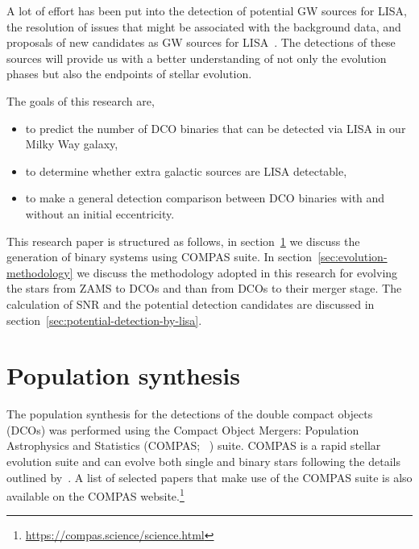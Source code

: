 \documentclass[journal, twocolumn]{IEEEtran}
\begin{document}
    A lot of effort has been put into the detection of potential GW sources for LISA, the resolution of issues that might be associated with the background data, and proposals of new candidates as GW sources for LISA~\cite[see, for example,][]{Lau2020, Sesana2009, Khakhaleva2020, Renzo2021, Fumagalli2022, wagg2021gravitational, Broekgaarden2021, Shao2021, Andrews2020, Belczynski2010, Guo2017, Babak2010, Blaut2010, Babak2008, Ruiter2010, Nelemans2001, Yu2010}.
    The detections of these sources will provide us with a better understanding of not only the evolution phases but also the endpoints of stellar evolution.

    The goals of this research are,
    \begin{itemize}%
        \item to predict the number of DCO binaries that can be detected via LISA in our Milky Way galaxy,
        \item to determine whether extra galactic sources are LISA detectable,
        \item to make a general detection comparison between DCO binaries with and without an initial eccentricity.
    \end{itemize}%

	This research paper is structured as follows, in section~\ref{sec:population_synthesis} we discuss the generation of binary systems using COMPAS suite. In section~\ref{sec:evolution-methodology} we discuss the methodology adopted in this research for evolving the stars from ZAMS to DCOs and than from DCOs to their merger stage. The calculation of SNR and the potential detection candidates are discussed in section~\ref{sec:potential-detection-by-lisa}. 



    \section{Population synthesis}
    \label{sec:population_synthesis}
    The population synthesis for the detections of the double compact objects (DCOs) was performed using the Compact Object Mergers: Population Astrophysics and Statistics (COMPAS; ~\cite{stevenson2017formation, Riley2022, Vigna2018}) suite.
    COMPAS is a rapid stellar evolution suite and can evolve both single and binary stars following the details outlined by~\cite{Hurley2000, Hurley2002}.
    A list of selected papers that make use of the COMPAS suite is also available on the COMPAS website.\footnote{\url{https://compas.science/science.html}}
\end{document}
